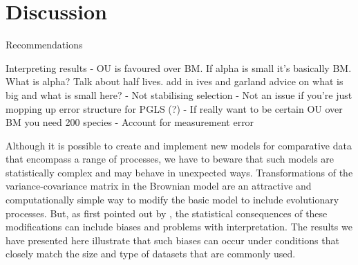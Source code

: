 \documentclass[a4paper,12pt]{article}
\begin{document}
\section{Discussion}
\label{section:discussion}

Recommendations

Interpreting results
 - OU is favoured over BM. If alpha is small it's basically BM. What
is alpha? Talk about half lives. add in ives and garland advice on what is big and what is small here?
 - Not stabilising selection
 - Not an issue if you're just mopping up error structure for PGLS (?)
 - If really want to be certain OU over BM you need 200 species
 - Account for measurement error



Although it is possible to create and implement new models for comparative data that encompass a range of processes, we have to beware that such models are statistically complex and may behave in unexpected ways. Transformations of the variance-covariance matrix in the Brownian model are an attractive and computationally simple way to modify the basic model to include evolutionary processes. But, as first pointed out by \citet{grafen1989phylogenetic}, the statistical consequences of these modifications can include biases and problems with interpretation. The results we have presented here illustrate that such biases can occur under conditions that closely match the size and type of datasets that are commonly used. 
\end{document}
